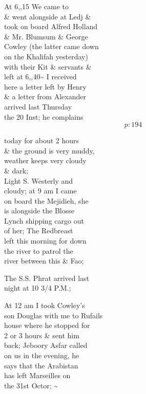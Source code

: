 \documentclass{report}
\begin{document}
	\par{
 	At 6,,15 We came to\ \\\& went alongside at Ledj \&\ \\took on board Alfred Holland\ \\\& Mr. Blumsum \& George\ \\Cowley (the latter came down\ \\on the Khalifah yesterday)\ \\with their Kit \& servants \&\ \\left at 6,,40\~{} I received\ \\here a letter left by Henry\ \\\& a letter from Alexander\ \\arrived last Thursday\ \\the 20 Inst; he complains\ \\
  \[p: 194 \]

	}


	\par{
 	today for about 2 hours\ \\\& the ground is very muddy,\ \\weather keeps very cloudy\ \\\& dark;\ \\Light S. Westerly and\ \\cloudy; at 9 am I came\ \\on board the Mejidieh, she\ \\is alongside the Blosse\ \\Lynch shipping cargo out\ \\of her; The Redbreast\ \\left this morning for down\ \\the river to patrol the\ \\river between this \& Fao;\ \\
	}

	\par{
 	The S.S. Phrat arrived last\ \\night at 10 3/4 P.M.;\ \\
	}

	\par{
 	At 12 am I took Cowley's\ \\son Douglas with me to Rufails\ \\house where he stopped for\ \\2 or 3 hours \& sent him\ \\back; Jeboory Asfar called\ \\on us in the evening, he\ \\says that the Arabistan\ \\has left Marseilles on\ \\the 31st Octor; \~{}\ \\
	}
\end{document}
